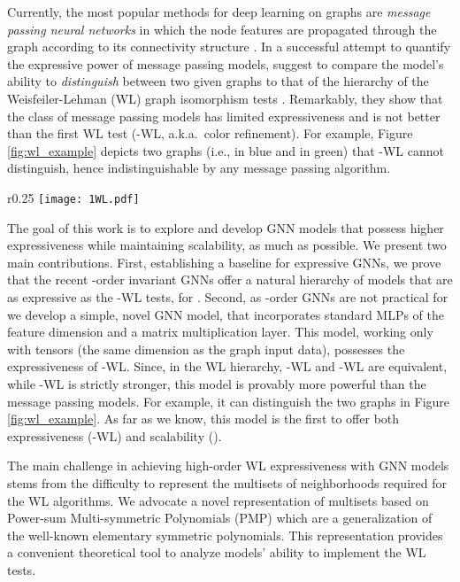 \documentclass{article}
\newcommand{\ie}{{i.e.}}
\begin{document}
Currently, the most popular methods for deep learning on graphs are \emph{message passing neural networks} in which the node features are propagated through the graph according to its connectivity structure \citep{Gilmer2017}.  In a successful attempt to quantify the expressive power of message passing models, \citet{morris2018weisfeiler,xu2018how} suggest to compare the model's ability to \emph{distinguish} between two given graphs to that of the hierarchy of the Weisfeiler-Lehman (WL) graph isomorphism tests \citep{grohe2017descriptive,babai2016graph}. Remarkably, they show that the class of message passing models has limited expressiveness and is not better than the first WL test (-WL, a.k.a.~color refinement).  For example, Figure \ref{fig:wl_example} depicts two graphs (\ie, in blue and in green) that -WL cannot distinguish, hence indistinguishable by any message passing algorithm.  

\begin{wrapfigure}[12]{r}{0.25\textwidth}
\vspace{-10pt}
\hspace{7pt}
\texttt{[image: 1WL.pdf]}
\vspace{0pt}
\caption{Two graphs not distinguished by -WL.}\label{fig:wl_example}
\end{wrapfigure} 


The goal of this work is to explore and develop GNN models that possess higher expressiveness while maintaining scalability, as much as possible. We present two main contributions. First, establishing a baseline for expressive GNNs, we prove that the recent -order invariant GNNs \citep{maron2018invariant,maron2019universality} offer a natural hierarchy of models that are as expressive as the -WL tests, for . Second, as -order GNNs are not practical for  we develop a simple, novel GNN model, that incorporates standard MLPs of the feature dimension and a matrix multiplication layer. This model, working only with  tensors (the same dimension as the graph input data), possesses the expressiveness of -WL. Since, in the WL hierarchy, -WL and -WL are equivalent, while -WL is strictly stronger, this model is provably more powerful than the message passing models. For example, it can distinguish the two graphs in Figure \ref{fig:wl_example}. As far as we know, this model is the first to offer both expressiveness (-WL) and scalability (). 

The main challenge in achieving high-order WL expressiveness with GNN models stems from the difficulty to represent the multisets of neighborhoods required for the WL algorithms.  We advocate a novel representation of multisets based on Power-sum Multi-symmetric Polynomials (PMP) which are a generalization of the well-known elementary symmetric polynomials. This representation provides a convenient theoretical tool to analyze models' ability to implement the WL tests. 
\end{document}
